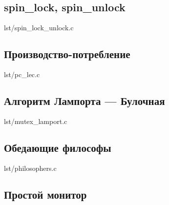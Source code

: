 \newpage

\subsection{spin\_lock, spin\_unlock}

\begin{lstinputlisting}[
        label={lst:},
        caption={}
    ]{lst/spin_lock_unlock.c}
\end{lstinputlisting}

\newpage

\subsection{Производство-потребление}

\begin{lstinputlisting}[
        label={lst:},
        caption={}
    ]{lst/pc_lec.c}
\end{lstinputlisting}

\newpage

\subsection{Алгоритм Лампорта --- Булочная}

\begin{lstinputlisting}[
        label={lst:},
        caption={}
    ]{lst/mutex_lamport.c}
\end{lstinputlisting}

\newpage

\subsection{Обедающие философы}

\begin{lstinputlisting}[
        label={lst:},
        caption={}
    ]{lst/philosophers.c}
\end{lstinputlisting}

\newpage

\subsection{Простой монитор}

